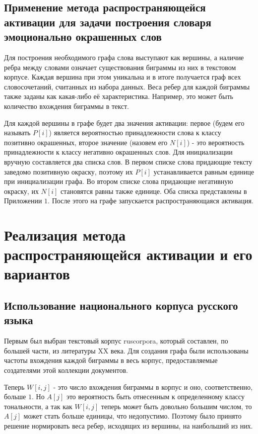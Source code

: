 \subsection{Применение метода распространяющейся активации для задачи построения
  словаря эмоционально окрашенных слов}
Для построения необходимого графа слова выступают как вершины, а наличие
ребра между словами означает существования биграммы из них в текстовом корпусе.
Каждая вершина при этом уникальна и в итоге получается граф всех словосочетаний,
считанных из набора данных. Веса ребер для каждой биграммы также заданы
как какая-либо её характеристика. Например, это может быть количество вхождения
биграммы в текст.

Для каждой вершины в графе будет два значения активации: первое (будем его
называть $P[i]$) является вероятностью принадлежности слова к классу позитивно
окрашенных, второе значение (назовем его $N[i]$) - это вероятность принадлежности
к классу негативно окрашенных слов. Для инициализации вручную составляется
два списка слов. В первом списке слова придающие тексту заведомо позитивную
окраску, поэтому их $P[i]$ устанавливается равным единице при инициализации графа.
Во втором списке слова придающие негативную окраску, их $N[i]$ становятся равны
также единице. Оба списка представлены в Приложении $1$. После этого на графе
запускается распространяющаяся активация.

\section{Реализация метода распространяющейся активации и его вариантов}
\subsection{Использование национального корпуса русского языка}
Первым был выбран текстовый корпус ruscorpora, который составлен, по большей
части, из литературы XX века. Для создания графа были использованы частоты
вхождения каждой биграммы в весь корпус, предоставляемые создателями этой
коллекции документов.

Теперь $W[i, j]$ - это число вхождения биграммы в корпус и оно, соответственно,
больше $1$. Но $A[j]$ это вероятность быть отнесенным к определенному классу
тональности, а так как $W[i, j]$ теперь может быть довольно большим числом, то
$A[j]$ может стать больше единицы, что недопустимо. Поэтому было принято решение
нормировать веса ребер, исходящих из вершины, на наибольший из них.

